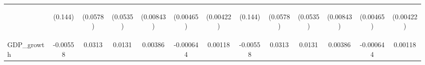 \documentclass[]{article}
\begin{document}
\begin{center}
\begin{tabular}{lcccccccccccc}
\vspace{4pt} & \begin{footnotesize}(0.144)\end{footnotesize} & \begin{footnotesize}(0.0578)\end{footnotesize} & \begin{footnotesize}(0.0535)\end{footnotesize} & \begin{footnotesize}(0.00843)\end{footnotesize} & \begin{footnotesize}(0.00465)\end{footnotesize} & \begin{footnotesize}(0.00422)\end{footnotesize} & \begin{footnotesize}(0.144)\end{footnotesize} & \begin{footnotesize}(0.0578)\end{footnotesize} & \begin{footnotesize}(0.0535)\end{footnotesize} & \begin{footnotesize}(0.00843)\end{footnotesize} & \begin{footnotesize}(0.00465)\end{footnotesize} & \begin{footnotesize}(0.00422)\end{footnotesize} \\
GDP\_growth & -0.00558 & 0.0313 & 0.0131 & 0.00386 & -0.000644 & 0.00118 & -0.00558 & 0.0313 & 0.0131 & 0.00386 & -0.000644 & 0.00118 \\

\end{tabular}
\end{center}
\end{document}
